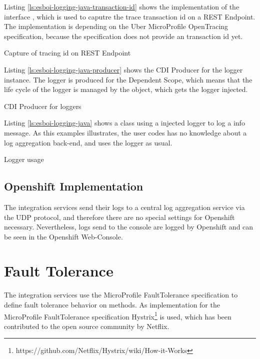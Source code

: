 Listing \vref{ls:esboi-logging-java-transaction-id} shows the implementation of the interface , which is used to caputre the trace transaction id on a REST Endpoint. The implementation is depending on the Uber MicroProfile OpenTracing specification, because the specification does not provide an transaction id yet.

\begin{listing}
	\caption{Capture of tracing id on REST Endpoint}
	\label{ls:esboi-logging-java-transaction-id}
\end{listing} 

Listing \vref{ls:esboi-logging-java-producer} shows the CDI Producer for the logger instance. The logger is produced for the Dependent Scope, which means that the life cycle of the logger is managed by the object, which gets the logger injected.

\begin{listing}
	\caption{CDI Producer for loggers}
	\label{ls:esboi-logging-java-producer}
\end{listing} 

Listing \vref{ls:esboi-logging-java} shows a class using a injected logger to log a info message. As this examples illustrates, the user codes has no knowledge about a log aggregation back-end, and uses the logger as usual.

\begin{listing}
	\caption{Logger usage}
	\label{ls:esboi-logging-java}
\end{listing} 

\subsection{Openshift Implementation}
\label{sec:esbi-logging-openshift}
The integration services send their logs to a central log aggregation service via the UDP protocol, and therefore there are no special settings for Openshift necessary. Nevertheless, logs send to the console are logged by Openshift and can be seen in the Openshift Web-Console.

\section{Fault Tolerance}
\label{sec:esbi-fault}
The integration services use the MicroProfile FaultTolerance specification to define fault tolerance behavior on methods. As implementation for the MicroProfile FaultTolerance specification  Hystrix\footnote{https://github.com/Netflix/Hystrix/wiki/How-it-Works} is used, which has been contributed to the open source community by Netflix.

